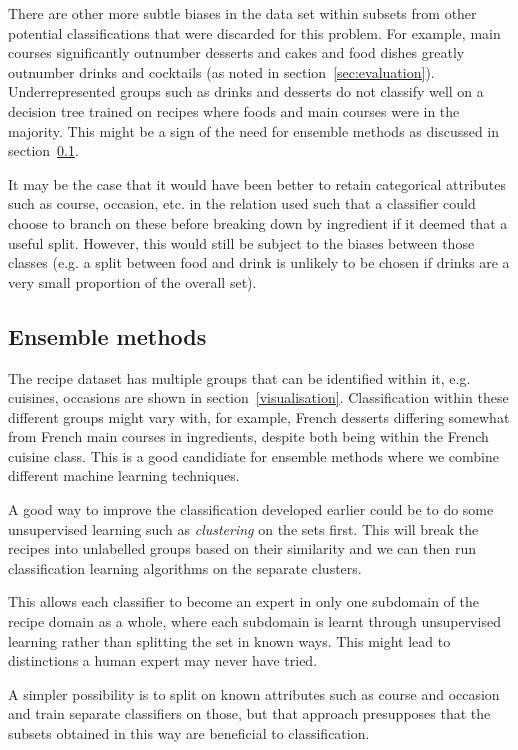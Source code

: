 \documentclass[11pt,a4paper]{article}
\begin{document}
There are other more subtle biases in the data set within subsets from other
potential classifications that were discarded for this problem. For example,
main courses significantly outnumber desserts and cakes and food dishes
greatly outnumber drinks and cocktails (as noted in section~\ref{sec:evaluation}).
Underrepresented groups such as drinks and desserts do not classify well
on a decision tree trained on recipes where foods and main courses were in
the majority. This might be a sign of the need for ensemble methods as discussed
in section~\ref{sec:ensemble}.

It may be the case that it would have been better to retain categorical
attributes such as course, occasion, etc. in the relation used such that
a classifier could choose to branch on these before breaking down by
ingredient if it deemed that a useful split. However, this would still
be subject to the biases between those classes (e.g. a split between
food and drink is unlikely to be chosen if drinks are a very small
proportion of the overall set).

\subsection{Ensemble methods}
\label{sec:ensemble}

The recipe dataset has multiple groups that can be identified within it, e.g.
cuisines, occasions are shown in section~\ref{visualisation}. Classification
within these different groups might vary with, for example, French desserts
differing somewhat from French main courses in ingredients, despite both
being within the French cuisine class. This is a good candidiate for ensemble
methods where we combine different machine learning techniques.

A good way to improve the classification developed earlier could be to do
some unsupervised learning such as \emph{clustering} on the sets first. This
will break the recipes into unlabelled groups based on their similarity and
we can then run classification learning algorithms on the separate clusters.

This allows each classifier to become an expert in only one subdomain of
the recipe domain as a whole, where each subdomain is learnt through
unsupervised learning rather than splitting the set in known ways. This might
lead to distinctions a human expert may never have tried.

A simpler possibility is to split on known attributes such as course and
occasion and train separate classifiers on those, but that approach
presupposes that the subsets obtained in this way are beneficial to
classification.
\end{document}
